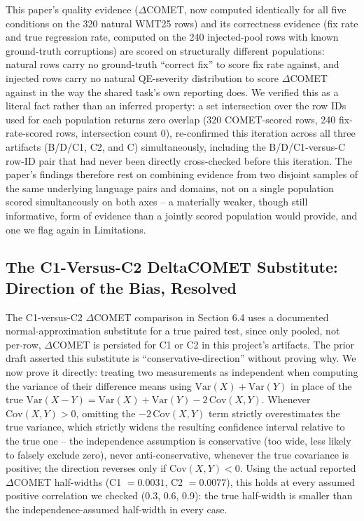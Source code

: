 \documentclass[11pt,letterpaper]{article}
\begin{document}
This paper's quality evidence ($\Delta$COMET, now computed identically for all five conditions on the 320 natural WMT25 rows) and its correctness evidence (fix rate and true regression rate, computed on the 240 injected-pool rows with known ground-truth corruptions) are scored on structurally different populations: natural rows carry no ground-truth ``correct fix'' to score fix rate against, and injected rows carry no natural QE-severity distribution to score $\Delta$COMET against in the way the shared task's own reporting does. We verified this as a literal fact rather than an inferred property: a set intersection over the row IDs used for each population returns zero overlap (320 COMET-scored rows, 240 fix-rate-scored rows, intersection count 0), re-confirmed this iteration across all three artifacts (B/D/C1, C2, and C) simultaneously, including the B/D/C1-versus-C row-ID pair that had never been directly cross-checked before this iteration. The paper's findings therefore rest on combining evidence from two disjoint samples of the same underlying language pairs and domains, not on a single population scored simultaneously on both axes -- a materially weaker, though still informative, form of evidence than a jointly scored population would provide, and one we flag again in Limitations.

\subsection{The C1-Versus-C2 DeltaCOMET Substitute: Direction of the Bias, Resolved}

The C1-versus-C2 $\Delta$COMET comparison in Section 6.4 uses a documented normal-approximation substitute for a true paired test, since only pooled, not per-row, $\Delta$COMET is persisted for C1 or C2 in this project's artifacts. The prior draft asserted this substitute is ``conservative-direction'' without proving why. We now prove it directly: treating two measurements as independent when computing the variance of their difference means using $\mathrm{Var}(X)+\mathrm{Var}(Y)$ in place of the true $\mathrm{Var}(X-Y)=\mathrm{Var}(X)+\mathrm{Var}(Y)-2\,\mathrm{Cov}(X,Y)$. Whenever $\mathrm{Cov}(X,Y)>0$, omitting the $-2\,\mathrm{Cov}(X,Y)$ term strictly overestimates the true variance, which strictly widens the resulting confidence interval relative to the true one -- the independence assumption is conservative (too wide, less likely to falsely exclude zero), never anti-conservative, whenever the true covariance is positive; the direction reverses only if $\mathrm{Cov}(X,Y)<0$. Using the actual reported $\Delta$COMET half-widths (C1 $=0.0031$, C2 $=0.0077$), this holds at every assumed positive correlation we checked (0.3, 0.6, 0.9): the true half-width is smaller than the independence-assumed half-width in every case.
\end{document}
